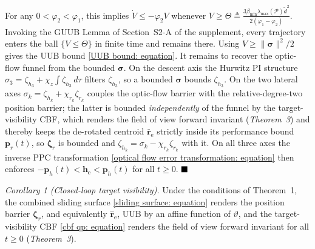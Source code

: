 {For any $0<\varphi_2<\varphi_1$, this implies $\dot{V}\le-\varphi_2 V$ whenever $V\ge\Theta\triangleq \tfrac{3\beta_{\min}\lambda_{\max}(\mathcal{P})\tilde{d}^2}{2(\varphi_1-\varphi_2)}$. Invoking the GUUB Lemma of Section~S2-A of the supplement, every trajectory enters the ball $\{V\le\Theta\}$ in finite time and remains there. Using $V\ge\|\boldsymbol{\sigma}\|^2/2$ gives the UUB bound \eqref{UUB bound: equation}. It remains to recover the optic-flow funnel from the bounded $\boldsymbol{\sigma}$. On the descent axis the Hurwitz PI structure $\sigma_3=\zeta_{h_3}+\chi_z\!\int\zeta_{h_3}\,d\tau$ filters $\zeta_{h_3}$, so a bounded $\boldsymbol{\sigma}$ bounds $\zeta_{h_3}$. On the two lateral axes $\sigma_k=\zeta_{h_k}+\chi_{r_k}\zeta_{r_k}$ couples the optic-flow barrier with the relative-degree-two position barrier; the latter is bounded \emph{independently} of the funnel by the target-visibility CBF, which renders the field of view forward invariant (\textit{Theorem~3}) and thereby keeps the de-rotated centroid $\bar{\boldsymbol{r}}_\text{e}$ strictly inside its performance bound $\boldsymbol{p}_r(t)$, so $\boldsymbol{\zeta}_r$ is bounded and $\zeta_{h_k}=\sigma_k-\chi_{r_k}\zeta_{r_k}$ with it. On all three axes the inverse PPC transformation \eqref{optical flow error transformation: equation} then enforces $-\boldsymbol{p}_h(t)<\boldsymbol{h}_\text{e}<\boldsymbol{p}_h(t)$ for all $t\ge 0$. $\hfill\blacksquare$}

\textit{Corollary 1 (Closed-loop target visibility).} Under the conditions of Theorem~1, the combined sliding surface \eqref{sliding surface: equation} renders the position barrier $\boldsymbol{\zeta}_r$, and equivalently $\hat{\boldsymbol{r}}_\text{e}$, UUB by an affine function of $\vartheta$, and the target-visibility CBF \eqref{cbf qp: equation} renders the field of view forward invariant for all $t\ge 0$ (\textit{Theorem~3}).


